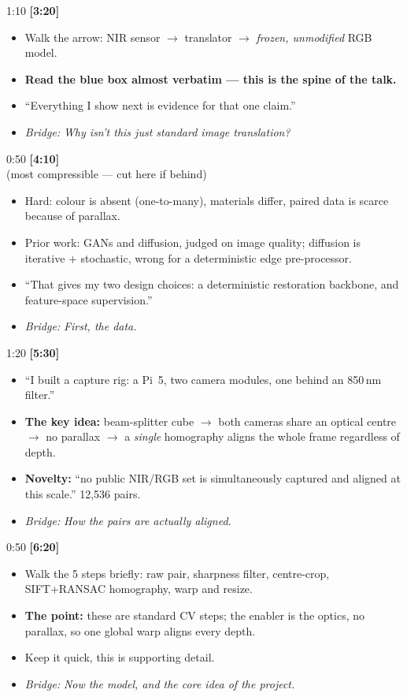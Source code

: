\documentclass[11pt]{article}
\newcommand{\slidehd}[3]{%
  \vspace{6pt}\noindent{\bfseries\textcolor{ICLBlue}{#1}}%
  \hfill{\small #2 \quad\textbf{[#3]}}\\[1pt]}
\newcommand{\bridge}[1]{\textit{\textcolor{ICLBlue}{Bridge:}} \textit{#1}}
\begin{document}
\slidehd{4. The idea + thesis}{1:10}{3:20}
\begin{itemize}
	\item Walk the arrow: NIR sensor $\to$ translator $\to$ \emph{frozen, unmodified} RGB model.
	\item \textcolor{Hi}{\textbf{Read the blue box almost verbatim --- this is the spine of the talk.}}
	\item ``Everything I show next is evidence for that one claim.''
	\item \bridge{Why isn't this just standard image translation?}
\end{itemize}

\slidehd{5. Why it's hard + prior work}{0:50}{4:10} \textnormal{\small\textcolor{Hi}{(most compressible --- cut here if behind)}}
\begin{itemize}
	\item Hard: colour is absent (one-to-many), materials differ, paired data is scarce because of parallax.
	\item Prior work: GANs and diffusion, judged on image quality; diffusion is iterative + stochastic, wrong for a deterministic edge pre-processor.
	\item ``That gives my two design choices: a deterministic restoration backbone, and feature-space supervision.''
	\item \bridge{First, the data.}
\end{itemize}

\slidehd{6. Data: the rig}{1:20}{5:30}
\begin{itemize}
	\item ``I built a capture rig: a Pi~5, two camera modules, one behind an 850\,nm filter.''
	\item \textbf{The key idea:} beam-splitter cube $\to$ both cameras share an optical centre $\to$ no parallax $\to$ a \emph{single} homography aligns the whole frame regardless of depth.
	\item \textcolor{Hi}{\textbf{Novelty:}} ``no public NIR/RGB set is simultaneously captured and aligned at this scale.'' 12{,}536 pairs.
	\item \bridge{How the pairs are actually aligned.}
\end{itemize}

\slidehd{7. Producing aligned pairs}{0:50}{6:20}
\begin{itemize}
	\item Walk the 5 steps briefly: raw pair, sharpness filter, centre-crop, SIFT+RANSAC homography, warp and resize.
	\item \textbf{The point:} these are standard CV steps; the enabler is the optics, no parallax, so one global warp aligns every depth.
	\item Keep it quick, this is supporting detail.
	\item \bridge{Now the model, and the core idea of the project.}
\end{itemize}
\end{document}
